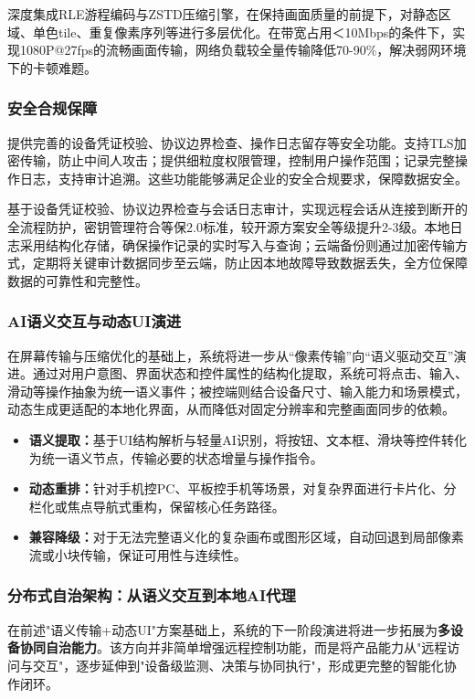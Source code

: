 \documentclass[12pt,a4paper]{article}
\begin{document}
深度集成RLE游程编码与ZSTD压缩引擎，在保持画面质量的前提下，对静态区域、单色tile、重复像素序列等进行多层优化。在带宽占用＜10Mbps的条件下，实现1080P@27fps的流畅画面传输，网络负载较全量传输降低70-90\%，解决弱网环境下的卡顿难题。

\subsubsection{安全合规保障}
提供完善的设备凭证校验、协议边界检查、操作日志留存等安全功能。支持TLS加密传输，防止中间人攻击；提供细粒度权限管理，控制用户操作范围；记录完整操作日志，支持审计追溯。这些功能能够满足企业的安全合规要求，保障数据安全。

基于设备凭证校验、协议边界检查与会话日志审计，实现远程会话从连接到断开的全流程防护，密钥管理符合等保2.0标准，较开源方案安全等级提升2-3级。本地日志采用结构化存储，确保操作记录的实时写入与查询；云端备份则通过加密传输方式，定期将关键审计数据同步至云端，防止因本地故障导致数据丢失，全方位保障数据的可靠性和完整性。

\subsubsection{AI语义交互与动态UI演进}
在屏幕传输与压缩优化的基础上，系统将进一步从“像素传输”向“语义驱动交互”演进。通过对用户意图、界面状态和控件属性的结构化提取，系统可将点击、输入、滑动等操作抽象为统一语义事件；被控端则结合设备尺寸、输入能力和场景模式，动态生成更适配的本地化界面，从而降低对固定分辨率和完整画面同步的依赖。

\begin{itemize}[noitemsep]
  \item \textbf{语义提取：}基于UI结构解析与轻量AI识别，将按钮、文本框、滑块等控件转化为统一语义节点，传输必要的状态增量与操作指令。
  \item \textbf{动态重排：}针对手机控PC、平板控手机等场景，对复杂界面进行卡片化、分栏化或焦点导航式重构，保留核心任务路径。
  \item \textbf{兼容降级：}对于无法完整语义化的复杂画布或图形区域，自动回退到局部像素流或小块传输，保证可用性与连续性。
\end{itemize}

\subsubsection{分布式自治架构：从语义交互到本地AI代理}

在前述"语义传输+动态UI"方案基础上，系统的下一阶段演进将进一步拓展为\textbf{多设备协同自治能力}。该方向并非简单增强远程控制功能，而是将产品能力从"远程访问与交互"，逐步延伸到"设备级监测、决策与协同执行"，形成更完整的智能化协作闭环。
\end{document}
